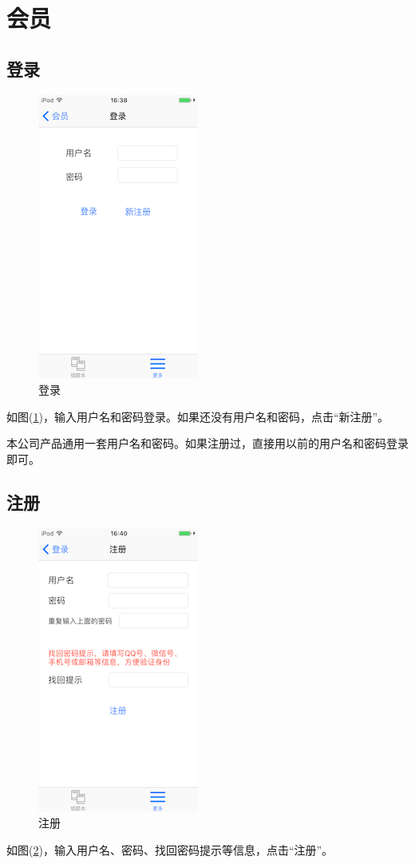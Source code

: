 \section{会员}

\subsection{登录}
\begin{figure}[H]
	\centering
	\includegraphics{img/27.png}
	\caption{登录}
	\label{img27}
\end{figure}
如图(\ref{img27})，输入用户名和密码登录。如果还没有用户名和密码，点击“新注册”。

本公司产品通用一套用户名和密码。如果注册过，直接用以前的用户名和密码登录即可。

\subsection{注册}
\begin{figure}[H]
	\centering
	\includegraphics{img/28.png}
	\caption{注册}
	\label{img28}
\end{figure}
如图(\ref{img28})，输入用户名、密码、找回密码提示等信息，点击“注册”。

